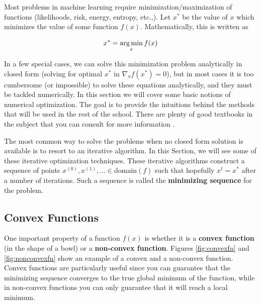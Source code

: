 Most problems in machine learning require minimization/maximization of functions (likelihoods, risk, energy, entropy, etc.,). Let $x^*$ be the value of $x$ which minimizes the value of some function $f(x)$. Mathematically, this is written as

\begin{equation*}
x^* = \operatorname*{arg\,min}_x f(x)
\end{equation*}

In a few special cases, we can solve this minimization problem analytically in closed form (solving for optimal $x^{*}$ in  $\nabla_{x}f(x^{*})=0$), but in most cases it is too cumbersome (or impossible) to solve these equations analytically, and they must be tackled numerically. In this section we will cover some basic notions of numerical optimization. The goal is to provide the intuitions behind the methods that will be used in the rest of the school. There are plenty of good textbooks in the subject that you can consult for more information \citep{Nocedal1999,bertsekas1995np,boyd2004convex}.

The most common way to solve the problems when no closed form solution is available is to resort to an iterative algorithm. In this Section, we will see some of these iterative optimization techniques. These iterative algorithms construct a sequence of points $x^{(0)},x^{(1)},\ldots \in \text{domain}(f)$ such that hopefully $x^t = x^*$ after a number of iterations.
Such a sequence is called the {\bf minimizing sequence} for the problem.

\subsection{Convex Functions}

One important property of a function $f(x)$ is whether it is a \textbf{convex function} (in the shape of a bowl) or a \textbf{non-convex function}. Figures \ref{fig:convexfn} and \ref{fig:nonconvexfn} show an example of a convex and a non-convex function. Convex functions are particularly useful since you can guarantee that the minimizing sequence converges to the true global minimum of the function, while in non-convex functions you can only guarantee that it will reach a local minimum. 


